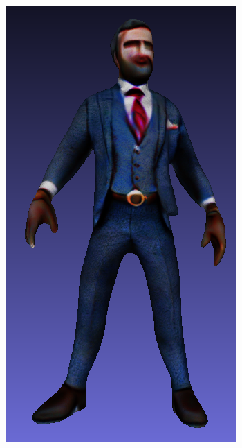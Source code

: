 \begin{figure}[ht]
\begin{subfigure}[b]{0.16\textwidth}
        \centering
        \includegraphics[width=\textwidth]{figures/appendix/bias_rich_genie_3.png}
        \caption{}
    \end{subfigure}
    \begin{subfigure}[b]{0.097\textwidth}
        \centering

\end{subfigure}
\end{figure}
